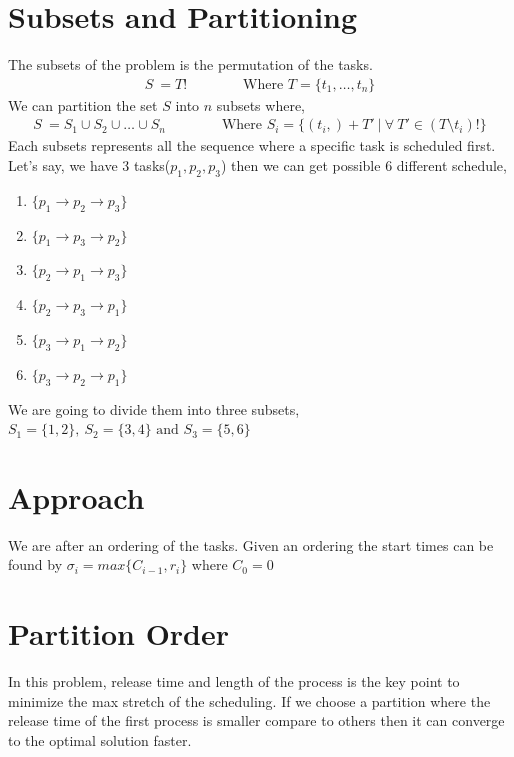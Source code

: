 \documentclass[11pt, conference, onecolumn]{IEEEtran}
\begin{document}
\section{Subsets and Partitioning}
The subsets of the problem is the permutation of the tasks. 
\begin{equation*}
\begin{array}{l}
S\ = T! \qquad\qquad\text{Where } T =\{t_1,\dots,t_n\}
\end{array}
\end{equation*}
We can partition the set $S$ into $n$ subsets where,
\begin{equation*}
\begin{array}{l}
S\ = S_1\cup S_2\cup \dots\cup S_n \qquad\qquad \text{Where }S_i = \{ (t_i,) + T'\ |\  \forall \ T' \in (T \setminus t_i)! \}
\end{array}
\end{equation*}
Each subsets represents all the sequence where a specific task is scheduled first.
Let's say, we have 3 tasks($p_1,p_2,p_3$) then we can get possible 6 different schedule,
\begin{enumerate}
\item $\{p_1\rightarrow p_2\rightarrow  p_3\}$
\item $\{p_1\rightarrow  p_3\rightarrow  p_2\}$
\item $\{p_2\rightarrow  p_1\rightarrow  p_3\}$
\item $\{p_2\rightarrow  p_3\rightarrow  p_1\}$
\item $\{p_3\rightarrow  p_1\rightarrow  p_2\}$
\item $\{p_3\rightarrow  p_2\rightarrow  p_1\}$ 
\end{enumerate}
We are going to divide them into three subsets, $S_1=\{1,2\},\ S_2=\{3,4\} \text{ and } S_3=\{5,6\}$
\section{Approach}
We are after an ordering of the tasks. Given an ordering the start times can be found by $ \sigma_i = max \{ C_{i-1}, r_i \}$ where $C_0 = 0 $

\section{Partition Order}
In this problem, release time and length of the process is the key point to minimize the max stretch of the scheduling. 
If we choose a partition where the release time of the first process is smaller compare to others then it can converge to 
the optimal solution faster.
\end{document}
